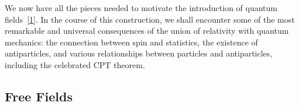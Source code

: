 

We now have all the pieces needed to motivate the introduction of quantum
fields~\hyperref[ref:5.1]{[1]}. In the course of this construction, we shall encounter some of
the most remarkable and universal consequences of the union of relativity
with quantum mechanics: the connection between spin and statistics, the
existence of antiparticles, and various relationships between particles and
antiparticles, including the celebrated CPT theorem.

\subsection{Free Fields}

